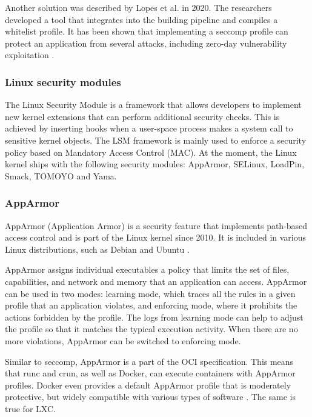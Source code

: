 Another solution was described by Lopes et al. in 2020. The researchers developed a tool that integrates into the building pipeline and compiles a whitelist profile. It has been shown that implementing a seccomp profile can protect an application from several attacks, including zero-day vulnerability exploitation \cite{acm:7}. 

\subsubsection*{Linux security modules}

The Linux Security Module is a framework that allows developers to implement new kernel extensions that can perform additional security checks. This is achieved by inserting hooks when a user-space process makes a system call to sensitive kernel objects. The LSM framework is mainly used to enforce a security policy based on Mandatory Access Control (MAC). At the moment, the Linux kernel ships with the following security modules: AppArmor, SELinux, LoadPin, Smack, TOMOYO and Yama.

\subsubsection*{AppArmor}

AppArmor (Application Armor) is a security feature that implements path-based access control and is part of the Linux kernel since 2010. It is included in various Linux distributions, such as Debian and Ubuntu \cite{s:wikiapparmor}.

AppArmor assigns individual executables a policy that limits the set of files, capabilities, and network and memory that an application can access. AppArmor can be used in two modes: learning mode, which traces all the rules in a given profile that an application violates, and enforcing mode, where it prohibits the actions forbidden by the profile. The logs from learning mode can help to adjust the profile so that it matches the typical execution activity. When there are no more violations, AppArmor can be switched to enforcing mode.

Similar to seccomp, AppArmor is a part of the OCI specification. This means that runc and crun, as well as Docker, can execute containers with AppArmor profiles. Docker even provides a default AppArmor profile that is moderately protective, but widely compatible with various types of software \cite{d:dockerapparmor}. The same is true for LXC.

